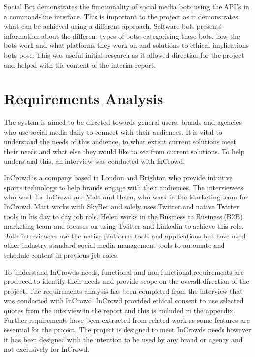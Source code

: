 \documentclass[chapterprefix=false]{scrreprt}
\begin{document}
Social Bot demonstrates the functionality of social media bots using the API's in a command-line interface. This is important to the project as it demonstrates what can be achieved using a different approach. Software bots presents information about the different types of bots, categorising these bots, how the bots work and what platforms they work on and solutions to ethical implications bots pose. This was useful initial research as it allowed direction for the project and helped with the content of the interim report.

\newpage

\section{Requirements Analysis}

The system is aimed to be directed towards general users, brands and agencies who use social media daily to connect with their audiences. It is vital to understand the needs of this audience, to what extent current solutions meet their needs and what else they would like to see from current solutions. To help understand this, an interview was conducted with InCrowd.

InCrowd is a company based in London and Brighton who provide intuitive sports technology to help brands engage with their audiences. The interviewees who work for InCrowd are Matt and Helen, who work in the Marketing team for InCrowd. Matt works with SkyBet and solely uses Twitter and native Twitter tools in his day to day job role. Helen works in the Business to Business (B2B) marketing team and focuses on using Twitter and Linkedin to achieve this role. Both interviewees use the native platforms tools and applications but have used other industry standard social media management tools to automate and schedule content in previous job roles.

To understand InCrowds needs, functional and non-functional requirements are produced to identify their needs and provide scope on the overall direction of the project. The requirements analysis has been completed from the interview that was conducted with InCrowd. InCrowd provided ethical consent to use selected quotes from the interview in the report and this is included in the appendix. Further requirements have been extracted from related work as some features are essential for the project. The project is designed to meet InCrowds needs however it has been designed with the intention to be used by any brand or agency and not exclusively for InCrowd.
\end{document}
